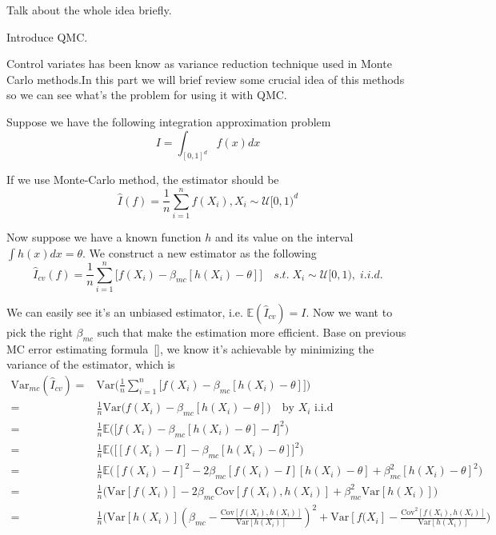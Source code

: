 


Talk about the whole idea briefly.\cite{hickernell2014reliable}


Introduce QMC.


Control variates has been know as variance reduction technique used in Monte Carlo methods.In this part we will brief review some crucial idea of this methods so we can see what's the problem for using it with QMC.\cite{hickernell2005control} 

Suppose we have the following integration approximation problem
\[I= \int_{[0,1]^d}f(x)dx\]

If we use Monte-Carlo method, the estimator should be 
\[
\hat{I}(f)=\frac{1}{n}\sum_{i=1}^{n}f(X_i), X_i\sim \mathcal{U}[0,1)^d
\]

Now suppose we have a known function $h$ and its value on the interval
$\int h(x)dx = \theta$. We construct a new estimator as the following 
\[ \hat{I}_{cv}(f)=\frac{1}{n}\sum_{i=1}^{n}\Big[ f(X_i)-\beta_{mc}[h(X_i)-\theta] \Big] \quad s.t.\; X_i\sim \mathcal{U}[0,1), \; i.i.d.\]

We can easily see it's an unbiased estimator, i.e. $\mathbb{E}(\hat{I}_{cv}) = I$. Now we want to pick the right $\beta_{mc}$ such that make the estimation more efficient. Base on previous MC error estimating formula~\eqref{}, we know it's achievable by minimizing the variance of the estimator, which is 
\begin{align*}
	\mathrm{Var}_{mc}(\hat{I}_{cv})
    =&\mathrm{Var}\Big( \frac{1}{n}\sum_{i=1}^{n}\big[ f(X_i)-\beta_{mc}[h(X_i)-\theta] \big]\Big)\\
    =&\frac{1}{n}\mathrm{Var}\Big(f(X_i)-\beta_{mc}[h(X_i)-\theta]\Big)\quad \text{by $X_i$ i.i.d} \\
    =&\frac{1}{n}\mathbb{E}\Big(\big[f(X_i)-\beta_{mc}[h(X_i)-\theta]-I\big]^2 \Big) \\
    =&\frac{1}{n}\mathbb{E}\Big(\big[ [f(X_i)-I] -\beta_{mc}[h(X_i)-\theta]\big]^2 \Big) \\
    =&\frac{1}{n}\mathbb{E}\big([f(X_i)-I]^2-2\beta_{mc}[f(X_i)-I][h(X_i)-\theta]+\beta_{mc}^2[h(X_i)-\theta]^2 \Big)\\
    =&\frac{1}{n}\Big(\mathrm{Var}[f(X_i)]-2\beta_{mc}\mathrm{Cov}[f(X_i),h(X_i)]+\beta_{mc}^2\mathrm{Var}[h(X_i)]\Big)\\
=&\frac{1}{n}\Big(\mathrm{Var}[h(X_i)](\beta_{mc}-\frac{\mathrm{Cov}[f(X_i),h(X_i)]}{\mathrm{Var}[h(X_i)]})^2+\mathrm{Var}[f(X_i]-\frac{\mathrm{Cov}^2[f(X_i),h(X_i)]}{\mathrm{Var}[h(X_i)]} \Big)
\end{align*}

